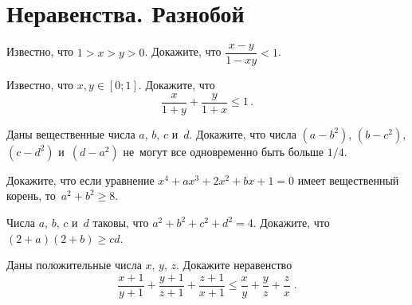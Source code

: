 
\section*{Неравенства. Разнобой}


\begin{problems}

\item
Известно, что $1 > x > y > 0$.
Докажите, что $\dfrac{x - y}{1 - x y} < 1$.


\item
Известно, что $x, y \in [0; 1]$.
Докажите, что
\[
    \frac{x}{1 + y} + \frac{y}{1 + x} \leq 1
\, .\]

\item
Даны вещественные числа $a$, $b$, $c$ и~$d$.
Докажите, что числа
$(a - b^2)$, $(b - c^2)$, $(c - d^2)$ и~$(d - a^2)$
не~могут все одновременно быть больше $1 / 4$.


\item
Докажите, что если уравнение $x^4 + a x^3 + 2 x^2 + b x + 1 = 0$ имеет
вещественный корень, то~$a^2 + b^2 \geq 8$.

\item
Числа $a$, $b$, $c$ и~$d$ таковы, что $a^2 + b^2 + c^2 + d^2 = 4$.
Докажите, что $(2 + a) (2 + b) \geq c d$.

\item
Даны положительные числа $x$, $y$, $z$.
Докажите неравенство
\[
    \frac{x + 1}{y + 1} + \frac{y + 1}{z + 1} + \frac{z + 1}{x + 1}
\leq
    \frac{x}{y} + \frac{y}{z} + \frac{z}{x}
\; . \]

\end{problems}

